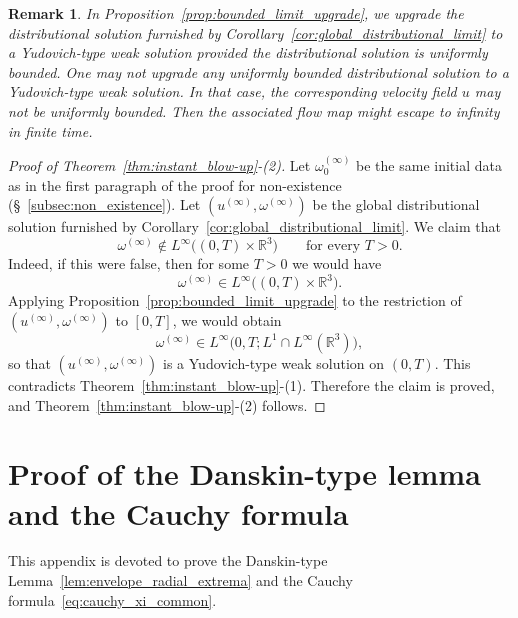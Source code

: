 \documentclass[reqno,11pt]{amsart}
\newtheorem{remark}{Remark}[section]
\begin{document}
\begin{remark}
\label{rem:diff_bd_dis_sol}
In Proposition~\ref{prop:bounded_limit_upgrade}, we upgrade the distributional solution furnished by Corollary~\ref{cor:global_distributional_limit} to a Yudovich-type weak solution provided the distributional solution is uniformly bounded. One may not upgrade any uniformly bounded distributional solution to a Yudovich-type weak solution. In that case, the corresponding velocity field $u$ may not be uniformly bounded. Then the associated flow map might escape to infinity in finite time. 
\end{remark}


\begin{proof}[Proof of Theorem~\ref{thm:instant_blow-up}-(2)]
Let $\omega_0^{(\infty) }$ be the same initial data as in the first paragraph of the proof for non-existence (\S~\ref{subsec:non_existence}).
Let \((u^{(\infty)},\omega^{(\infty)})\) be the global distributional solution furnished by
Corollary~\ref{cor:global_distributional_limit}. We claim that
\[
\omega^{(\infty)}\notin L^\infty\bigl((0,T)\times\mathbb R^3\bigr)
\qquad\text{for every }T>0.
\]
Indeed, if this were false, then for some \(T>0\) we would have
\[
\omega^{(\infty)}\in L^\infty\bigl((0,T)\times\mathbb R^3\bigr).
\]
Applying Proposition~\ref{prop:bounded_limit_upgrade} to the restriction of
\((u^{(\infty)},\omega^{(\infty)})\) to \([0,T]\), we would obtain
\[
\omega^{(\infty)}\in L^\infty\bigl(0,T;L^1\cap L^\infty(\mathbb R^3)\bigr),
\]
so that \((u^{(\infty)},\omega^{(\infty)})\) is a Yudovich-type weak solution on \((0,T)\). This contradicts
Theorem~\ref{thm:instant_blow-up}-(1). Therefore the claim is proved, and Theorem~\ref{thm:instant_blow-up}-(2) follows.
\end{proof}















\appendix




\section{Proof of the Danskin-type lemma and the Cauchy formula}
\label{app:two_lemmas}
This appendix is devoted to prove the Danskin-type Lemma~\ref{lem:envelope_radial_extrema} and the Cauchy formula~\eqref{eq:cauchy_xi_common}. 
\end{document}
